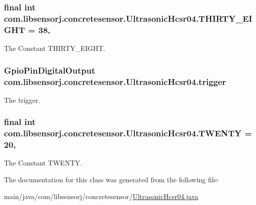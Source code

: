 \subsubsection[{T\+H\+I\+R\+T\+Y\+\_\+\+E\+I\+G\+H\+T}]{\setlength{\rightskip}{0pt plus 5cm}final int com.\+libsensorj.\+concretesensor.\+Ultrasonic\+Hcsr04.\+T\+H\+I\+R\+T\+Y\+\_\+\+E\+I\+G\+H\+T = 38\hspace{0.3cm}{\ttfamily [static]}, {\ttfamily [private]}}\label{classcom_1_1libsensorj_1_1concretesensor_1_1UltrasonicHcsr04_a25452283296d3780a7fefbfa20e40a93}
The Constant T\+H\+I\+R\+T\+Y\+\_\+\+E\+I\+G\+H\+T. \hypertarget{classcom_1_1libsensorj_1_1concretesensor_1_1UltrasonicHcsr04_a13705a8251de22d0f52caa3e17d23376}{}
\subsubsection[{trigger}]{\setlength{\rightskip}{0pt plus 5cm}Gpio\+Pin\+Digital\+Output com.\+libsensorj.\+concretesensor.\+Ultrasonic\+Hcsr04.\+trigger\hspace{0.3cm}{\ttfamily [private]}}\label{classcom_1_1libsensorj_1_1concretesensor_1_1UltrasonicHcsr04_a13705a8251de22d0f52caa3e17d23376}
The trigger. \hypertarget{classcom_1_1libsensorj_1_1concretesensor_1_1UltrasonicHcsr04_aa04a319fc4ef2ccf8de8a70bf27da2da}{}
\subsubsection[{T\+W\+E\+N\+T\+Y}]{\setlength{\rightskip}{0pt plus 5cm}final int com.\+libsensorj.\+concretesensor.\+Ultrasonic\+Hcsr04.\+T\+W\+E\+N\+T\+Y = 20\hspace{0.3cm}{\ttfamily [static]}, {\ttfamily [private]}}\label{classcom_1_1libsensorj_1_1concretesensor_1_1UltrasonicHcsr04_aa04a319fc4ef2ccf8de8a70bf27da2da}
The Constant T\+W\+E\+N\+T\+Y. 

The documentation for this class was generated from the following file\+:\begin{DoxyCompactItemize}
\item 
main/java/com/libsensorj/concretesensor/\hyperlink{UltrasonicHcsr04_8java}{Ultrasonic\+Hcsr04.\+java}\end{DoxyCompactItemize}

